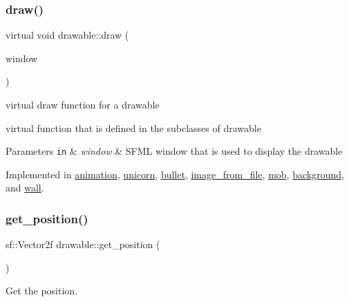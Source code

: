 \subsubsection{\texorpdfstring{draw()}{draw()}}
{\footnotesize\ttfamily virtual void drawable\+::draw (\begin{DoxyParamCaption}\item[{sf\+::\+Render\+Window \&}]{window }\end{DoxyParamCaption})\hspace{0.3cm}{\ttfamily [pure virtual]}}



virtual draw function for a drawable 

virtual function that is defined in the subclasses of drawable


\begin{DoxyParams}[1]{Parameters}
\mbox{\tt in}  & {\em window} & S\+F\+ML window that is used to display the drawable \\
\hline
\end{DoxyParams}


Implemented in \hyperlink{classanimation_a20959b66d1c25007890bb40f0e876570}{animation}, \hyperlink{classunicorn_a570c34d5669a8d2a61bdc1481e6f9dee}{unicorn}, \hyperlink{classbullet_ae999b952538687d45ca2ae54164a5cd8}{bullet}, \hyperlink{classimage__from__file_a26eae6c872ca9033cacc3f6eb2762983}{image\+\_\+from\+\_\+file}, \hyperlink{classmob_a52f5e29b2ac2d87c8c1be7e0ff5ec96b}{mob}, \hyperlink{classbackground_a41736f9a00defad1e84b3a8099c887e2}{background}, and \hyperlink{classwall_aa25b8377e1d9a209fabd2271294f05d0}{wall}.

\mbox{\label{classdrawable_a6a31ea381be2964d0115b782a66d3414}} 
\subsubsection{\texorpdfstring{get\+\_\+position()}{get\_position()}}
{\footnotesize\ttfamily sf\+::\+Vector2f drawable\+::get\+\_\+position (\begin{DoxyParamCaption}{ }\end{DoxyParamCaption})\hspace{0.3cm}{\ttfamily [virtual]}}



Get the position. 


